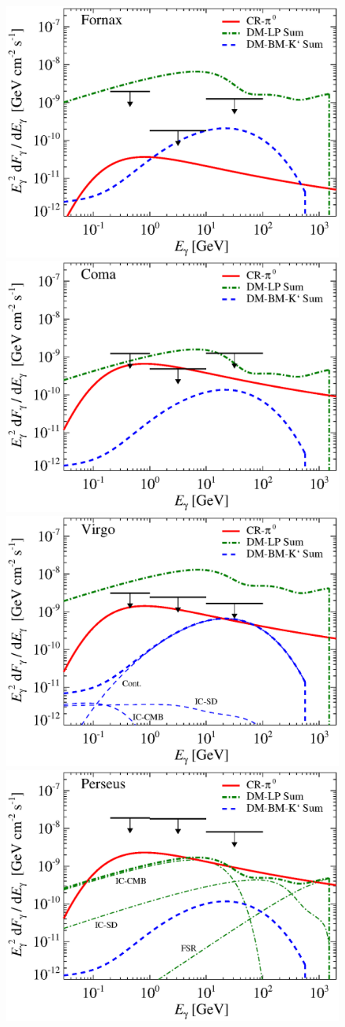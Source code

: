\documentclass[10pt,aps,pra,reprint,amsmath,amsfonts,amssymb,showpacs]{revtex4-1}
\begin{document}
\begin{figure}
\begin{minipage}{2.0\columnwidth}
 \includegraphics[width=0.49\columnwidth]{figures/flux.cluster.Fornax.v8.0.1deg.1.6T.SubMass.SF300.IR2.noMW.woGal.eps}
\includegraphics[width=0.49\columnwidth]{figures/flux.cluster.Coma.v8.0.1deg.1.6T.SubMass.SF300.IR2.noMW.woGal.eps}
\includegraphics[width=0.49\columnwidth]{figures/flux.cluster.Virgo.v8.0.1deg.1.6T.SubMass.SF300.IR2.noMW.woGal.eps}
\includegraphics[width=0.49\columnwidth]{figures/flux.cluster.Perseus.v8.0.1deg.1.6T.SubMass.SF300.IR2.noMW.woGal.eps}


\end{minipage}
\end{figure}
\end{document}
